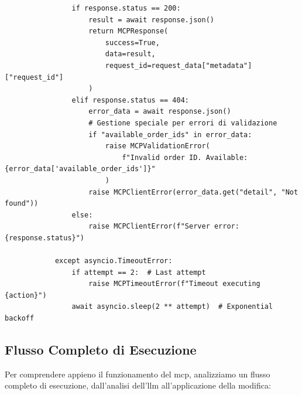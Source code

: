 \begin{listing}[H]
\begin{verbatim}
                if response.status == 200:
                    result = await response.json()
                    return MCPResponse(
                        success=True,
                        data=result,
                        request_id=request_data["metadata"]["request_id"]
                    )
                elif response.status == 404:
                    error_data = await response.json()
                    # Gestione speciale per errori di validazione
                    if "available_order_ids" in error_data:
                        raise MCPValidationError(
                            f"Invalid order ID. Available: {error_data['available_order_ids']}"
                        )
                    raise MCPClientError(error_data.get("detail", "Not found"))
                else:
                    raise MCPClientError(f"Server error: {response.status}")
                    
            except asyncio.TimeoutError:
                if attempt == 2:  # Last attempt
                    raise MCPTimeoutError(f"Timeout executing {action}")
                await asyncio.sleep(2 ** attempt)  # Exponential backoff
\end{verbatim}
\caption{Client MCP per il servizio LLM}
\label{listing:mcp-client}
\end{listing}

\subsection{Flusso Completo di Esecuzione}
\label{subsec:mcp_execution_flow}

Per comprendere appieno il funzionamento del \gls{mcp}, analizziamo un flusso completo di esecuzione, dall'analisi dell'\gls{llm} all'applicazione della modifica:


